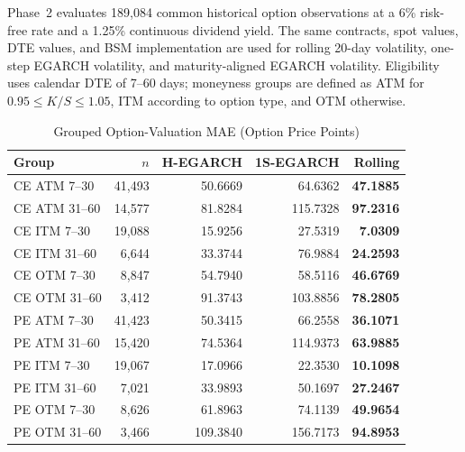 \documentclass[journal]{IEEEtran}
\begin{document}
Phase~2 evaluates 189{,}084 common historical option observations at a 6\% risk-free rate and a 1.25\% continuous dividend yield. The same contracts, spot values, DTE values, and BSM implementation are used for rolling 20-day volatility, one-step EGARCH volatility, and maturity-aligned EGARCH volatility. Eligibility uses calendar DTE of 7--60 days; moneyness groups are defined as ATM for $0.95\le K/S\le1.05$, ITM according to option type, and OTM otherwise.

\begin{table}[!t]
\renewcommand{\arraystretch}{1.12}
\caption{Grouped Option-Valuation MAE (Option Price Points)}
\label{tab:valuation_mae}
\centering
\scriptsize
\begin{tabular}{lrrrr}
\toprule
\textbf{Group} & $n$ & \textbf{H-EGARCH} & \textbf{1S-EGARCH} & \textbf{Rolling} \\
\midrule
CE ATM 7--30 & 41{,}493 & 50.6669 & 64.6362 & \textbf{47.1885} \\
CE ATM 31--60 & 14{,}577 & 81.8284 & 115.7328 & \textbf{97.2316} \\
CE ITM 7--30 & 19{,}088 & 15.9256 & 27.5319 & \textbf{7.0309} \\
CE ITM 31--60 & 6{,}644 & 33.3744 & 76.9884 & \textbf{24.2593} \\
CE OTM 7--30 & 8{,}847 & 54.7940 & 58.5116 & \textbf{46.6769} \\
CE OTM 31--60 & 3{,}412 & 91.3743 & 103.8856 & \textbf{78.2805} \\
PE ATM 7--30 & 41{,}423 & 50.3415 & 66.2558 & \textbf{36.1071} \\
PE ATM 31--60 & 15{,}420 & 74.5364 & 114.9373 & \textbf{63.9885} \\
PE ITM 7--30 & 19{,}067 & 17.0966 & 22.3530 & \textbf{10.1098} \\
PE ITM 31--60 & 7{,}021 & 33.9893 & 50.1697 & \textbf{27.2467} \\
PE OTM 7--30 & 8{,}626 & 61.8963 & 74.1139 & \textbf{49.9654} \\
PE OTM 31--60 & 3{,}466 & 109.3840 & 156.7173 & \textbf{94.8953} \\
\bottomrule
\end{tabular}
\end{table}
\end{document}
